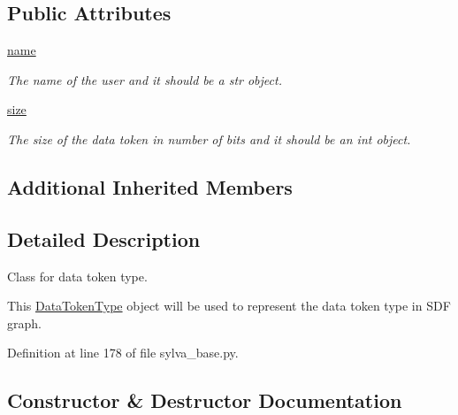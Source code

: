 \subsection*{Public Attributes}
\begin{DoxyCompactItemize}
\item 
\hyperlink{classsylva_1_1base_1_1sylva__base_1_1_data_token_type_acec25e05f040a88de235901b1096f4a8}{name}
\begin{DoxyCompactList}\small\item\em The name of the user and it should be a str object. \end{DoxyCompactList}\item 
\hyperlink{classsylva_1_1base_1_1sylva__base_1_1_data_token_type_ad2a181eb47ed614abc21072faf2e6849}{size}
\begin{DoxyCompactList}\small\item\em The size of the data token in number of bits and it should be an int object. \end{DoxyCompactList}\end{DoxyCompactItemize}
\subsection*{Additional Inherited Members}


\subsection{Detailed Description}
Class for data token type. 

This \hyperlink{classsylva_1_1base_1_1sylva__base_1_1_data_token_type}{Data\+Token\+Type} object will be used to represent the data token type in S\+DF graph. 

Definition at line 178 of file sylva\+\_\+base.\+py.



\subsection{Constructor \& Destructor Documentation}
\mbox{\label{classsylva_1_1base_1_1sylva__base_1_1_data_token_type_ac498e216378d20388bbfa59a83616a38}} 
